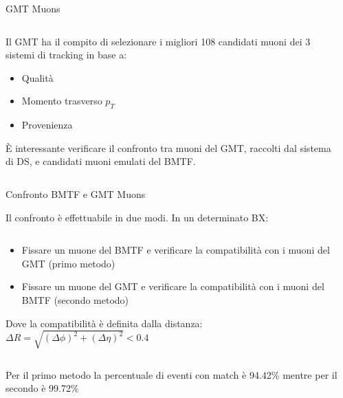 \documentclass{beamer}
\begin{document}
\begin{frame}{GMT Muons}

\begin{columns}

    \begin{column}{0.5\textwidth}
    Il GMT ha il compito di selezionare i migliori 108 candidati muoni dei 3 sistemi di tracking in base a:
    \begin{itemize}
        \item Qualità
        \item Momento trasverso $p_T$
        \item Provenienza
    \end{itemize}
    \vspace{0.5cm}
    È interessante verificare il confronto tra muoni del GMT, raccolti dal sistema di DS, e candidati muoni emulati del BMTF.
    

    \end{column}
    \begin{column}{0.5\textwidth}
        \centering
    \end{column}
\end{columns}

\end{frame}


\begin{frame}{Confronto BMTF e GMT Muons}

Il confronto è effettuabile in due modi. In un determinato BX:
\begin{columns}

    \begin{column}{0.5\textwidth}
        \begin{itemize}
            \item Fissare un muone del BMTF e verificare la compatibilità con i muoni del GMT (primo metodo)
            \item Fissare un muone del GMT e verificare la compatibilità con i muoni del BMTF (secondo metodo)
        \end{itemize}
        \vspace{0.5 cm}
        Dove la compatibilità è definita dalla distanza: $\Delta R = \sqrt{(\Delta \phi)^2 + (\Delta \eta)^2} < 0.4$
    \end{column}
    \begin{column}{0.5\textwidth}
        \centering
        \vspace{0.5 cm}
    \end{column}
\end{columns}

\vspace{0.5 cm}
Per il primo metodo la percentuale di eventi con match è 94.42\% mentre per il secondo è 99.72\%

\end{frame}
\end{document}
